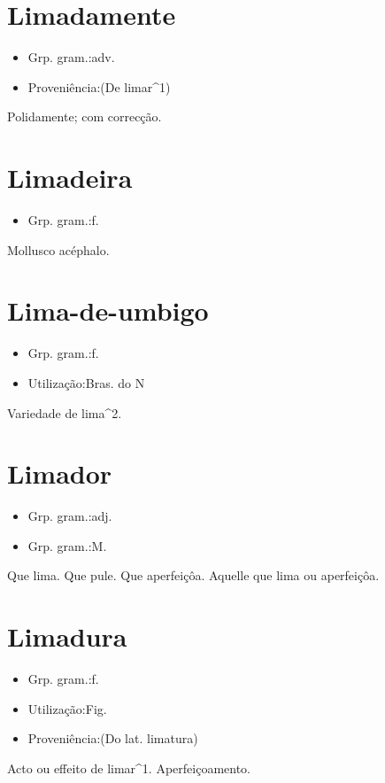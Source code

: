 \section{Limadamente}
\begin{itemize}
\item {Grp. gram.:adv.}
\end{itemize}
\begin{itemize}
\item {Proveniência:(De \textunderscore limar\textunderscore ^1)}
\end{itemize}
Polidamente; com correcção.
\section{Limadeira}
\begin{itemize}
\item {Grp. gram.:f.}
\end{itemize}
Mollusco acéphalo.
\section{Lima-de-umbigo}
\begin{itemize}
\item {Grp. gram.:f.}
\end{itemize}
\begin{itemize}
\item {Utilização:Bras. do N}
\end{itemize}
Variedade de lima^2.
\section{Limador}
\begin{itemize}
\item {Grp. gram.:adj.}
\end{itemize}
\begin{itemize}
\item {Grp. gram.:M.}
\end{itemize}
Que lima.
Que pule.
Que aperfeiçôa.
Aquelle que lima ou aperfeiçôa.
\section{Limadura}
\begin{itemize}
\item {Grp. gram.:f.}
\end{itemize}
\begin{itemize}
\item {Utilização:Fig.}
\end{itemize}
\begin{itemize}
\item {Proveniência:(Do lat. \textunderscore limatura\textunderscore )}
\end{itemize}
Acto ou effeito de limar^1.
Aperfeiçoamento.
